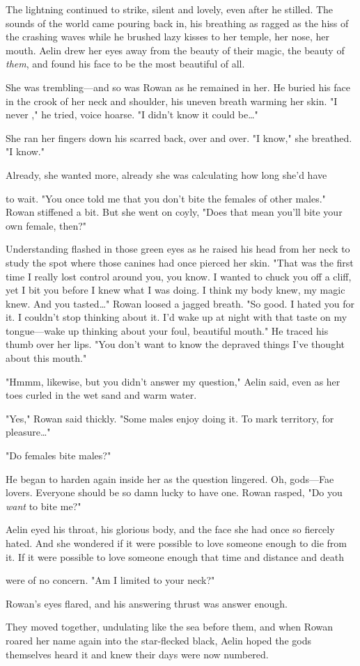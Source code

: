 The lightning continued to strike, silent and lovely, even after he stilled. The sounds of the world came pouring back in, his breathing as ragged as the hiss of the crashing waves while he brushed lazy kisses to her temple, her nose, her mouth. Aelin drew her eyes away from the beauty of their magic, the beauty of \emph{them}, and found his face to be the most beautiful of all.

She was trembling---and so was Rowan as he remained in her. He buried his face in the crook of her neck and shoulder, his uneven breath warming her skin. "I never  ," he tried, voice hoarse. "I didn't know it could be\ldots"

She ran her fingers down his scarred back, over and over. "I know," she breathed. "I know."

Already, she wanted more, already she was calculating how long she'd have

to wait. "You once told me that you don't bite the females of other males." Rowan stiffened a bit. But she went on coyly, "Does that mean
 you'll bite your own female, then?"

Understanding flashed in those green eyes as he raised his head from her neck to study the spot where those canines had once pierced her skin. "That was the first time I really lost control around you, you know. I wanted to chuck you off a cliff, yet I bit you before I knew what I was doing. I think my body knew, my magic knew. And you tasted\ldots" Rowan loosed a jagged breath. "So good. I hated you for it. I couldn't stop thinking about it. I'd wake up at night with that taste on my tongue---wake up thinking about your foul, beautiful mouth." He traced his thumb over her lips. "You don't want to know the depraved things I've thought about this mouth."

"Hmmm, likewise, but you didn't answer my question," Aelin said, even as her toes curled in the wet sand and warm water.

"Yes," Rowan said thickly. "Some males enjoy doing it. To mark territory, for pleasure\ldots"

"Do females bite males?"

He began to harden again inside her as the question lingered. Oh, gods---Fae lovers. Everyone should be so damn lucky to have one. Rowan rasped, "Do you \emph{want} to bite me?"

Aelin eyed his throat, his glorious body, and the face she had once so fiercely hated. And she wondered if it were possible to love someone enough to die from it. If it were possible to love someone enough that time and distance and death

were of no concern. "Am I limited to your neck?"

Rowan's eyes flared, and his answering thrust was answer enough.

They moved together, undulating like the sea before them, and when Rowan roared her name again into the star-flecked black, Aelin hoped the gods themselves heard it and knew their days were now numbered.
